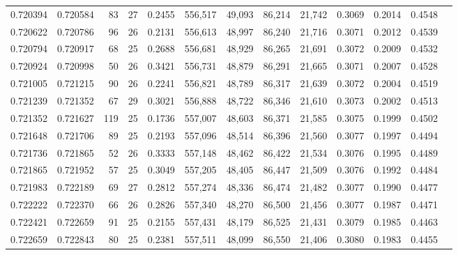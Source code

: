 \begin{tabular}{rrrrrrrrrrrrr}
0.720394 & 0.720584 &     83 &    27 &                                     0.2455 & 556,517 &  49,093 &  86,214 &  21,742 & 0.3069 & 0.2014 & 0.4548 \\
0.720622 & 0.720786 &     96 &    26 &                                     0.2131 & 556,613 &  48,997 &  86,240 &  21,716 & 0.3071 & 0.2012 & 0.4539 \\
0.720794 & 0.720917 &     68 &    25 &                                     0.2688 & 556,681 &  48,929 &  86,265 &  21,691 & 0.3072 & 0.2009 & 0.4532 \\
0.720924 & 0.720998 &     50 &    26 &                                     0.3421 & 556,731 &  48,879 &  86,291 &  21,665 & 0.3071 & 0.2007 & 0.4528 \\
0.721005 & 0.721215 &     90 &    26 &                                     0.2241 & 556,821 &  48,789 &  86,317 &  21,639 & 0.3072 & 0.2004 & 0.4519 \\
0.721239 & 0.721352 &     67 &    29 &                                     0.3021 & 556,888 &  48,722 &  86,346 &  21,610 & 0.3073 & 0.2002 & 0.4513 \\
0.721352 & 0.721627 &    119 &    25 &                                     0.1736 & 557,007 &  48,603 &  86,371 &  21,585 & 0.3075 & 0.1999 & 0.4502 \\
0.721648 & 0.721706 &     89 &    25 &                                     0.2193 & 557,096 &  48,514 &  86,396 &  21,560 & 0.3077 & 0.1997 & 0.4494 \\
0.721736 & 0.721865 &     52 &    26 &                                     0.3333 & 557,148 &  48,462 &  86,422 &  21,534 & 0.3076 & 0.1995 & 0.4489 \\
0.721865 & 0.721952 &     57 &    25 &                                     0.3049 & 557,205 &  48,405 &  86,447 &  21,509 & 0.3076 & 0.1992 & 0.4484 \\
0.721983 & 0.722189 &     69 &    27 &                                     0.2812 & 557,274 &  48,336 &  86,474 &  21,482 & 0.3077 & 0.1990 & 0.4477 \\
0.722222 & 0.722370 &     66 &    26 &                                     0.2826 & 557,340 &  48,270 &  86,500 &  21,456 & 0.3077 & 0.1987 & 0.4471 \\
0.722421 & 0.722659 &     91 &    25 &                                     0.2155 & 557,431 &  48,179 &  86,525 &  21,431 & 0.3079 & 0.1985 & 0.4463 \\
0.722659 & 0.722843 &     80 &    25 &                                     0.2381 & 557,511 &  48,099 &  86,550 &  21,406 & 0.3080 & 0.1983 & 0.4455 \\

\end{tabular}

